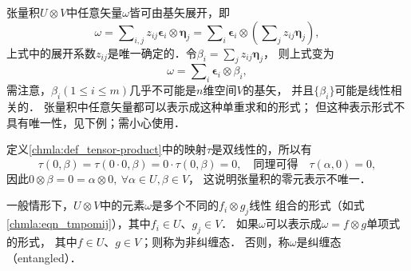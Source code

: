 张量积$U\otimes V$中任意矢量$\omega$皆可由基矢展开，即
\begin{equation}\label{chmla:eqn_tmpomij}
    \omega = \sum\nolimits_{i,j} z_{ij} \boldsymbol{\epsilon}_i \otimes \boldsymbol{\eta}_j
    = \sum\nolimits_{i} \boldsymbol{\epsilon}_i \otimes  \left(\sum\nolimits_{j}z_{ij}\boldsymbol{\eta}_j\right),
\end{equation}
上式中的展开系数$z_{ij}$是唯一确定的．令$\beta_i = \sum_{j}z_{ij}\boldsymbol{\eta}_j$，
则上式变为
\begin{equation}\label{chmla:eqn_tmp67}
    \omega = \sum\nolimits_{i} \boldsymbol{\epsilon}_i \otimes  \beta _i ,
\end{equation}
需注意，$\beta_i(1\leqslant i \leqslant m)$几乎不可能是$n$维空间$V$的基矢，
并且$\{\beta_i\}$可能是线性相关的．
张量积中任意矢量都可以表示成这种单重求和的形式；
但这种表示形式不具有唯一性，见下例；需小心使用．
\begin{example}
    定义\ref{chmla:def_tensor-product}中的映射$\tau$是双线性的，所以有
    \begin{equation*}
        \tau(0,\beta)=\tau(0\cdot 0,\beta)=0\cdot \tau(0,\beta)=0,
        \quad \text{同理可得}\quad\tau(\alpha,0)=0 ,
    \end{equation*}
    因此$0 \otimes \beta =0=\alpha \otimes 0, \ \forall \alpha \in U, \beta \in V$，
    这说明张量积的零元表示不唯一．
\end{example}


一般情形下，$U\otimes V$中的元素$\omega$是多个不同的$f_i\otimes g_j$线性
组合的形式（如式\eqref{chmla:eqn_tmpomij}），其中$f_i\in U$、$g_j\in V$．
如果$\omega$可以表示成$\omega=f\otimes g$单项式的形式，
其中$f\in U$、$g\in V$；则称为{\heiti 非纠缠态}．
否则，称$\omega$是{\heiti 纠缠态}（entangled）．    



